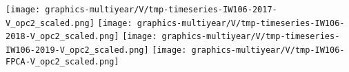 
\begin{center}
\begin{minipage}{7.0in}
\texttt{[image: graphics-multiyear/V/tmp-timeseries-IW106-2017-V\_opc2\_scaled.png]}
\quad\quad
\texttt{[image: graphics-multiyear/V/tmp-timeseries-IW106-2018-V\_opc2\_scaled.png]}
\vskip 1.0cm
\texttt{[image: graphics-multiyear/V/tmp-timeseries-IW106-2019-V\_opc2\_scaled.png]}
\quad
\texttt{[image: graphics-multiyear/V/tmp-IW106-FPCA-V\_opc2\_scaled.png]}
\end{minipage}
\end{center}


\renewcommand{\theenumi}{\roman{enumi}}
\renewcommand{\labelenumi}{\textnormal{(\theenumi)}$\;\;$}

